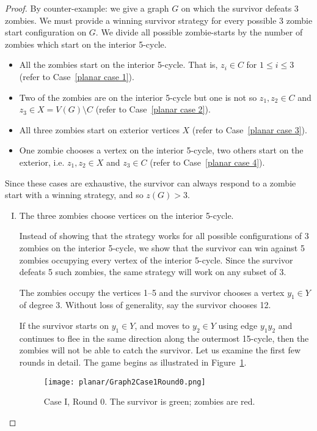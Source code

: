 \begin{proof}
  By counter-example: we give a graph $G$ on which the survivor defeats 3 zombies.
  We must provide a winning survivor strategy for every possible 3 zombie start configuration on $G$. We divide all possible zombie-starts by the number of zombies which start on the
  interior 5-cycle.

  \begin{itemize}
  \item All the zombies start on the interior 5-cycle. That is, $z_i \in C$ for $1 \leq i \leq 3$ (refer to Case~\ref{planar case 1}).
  \item Two of the zombies are on the interior 5-cycle but one is not so $z_1, z_2 \in C$ and $z_3 \in X = V(G) \setminus C$ (refer to Case~\ref{planar case 2}).
  \item All three zombies start on exterior vertices $X$ (refer to Case~\ref{planar case 3}).
  \item One zombie chooses a vertex on the interior 5-cycle, two others start on the exterior, i.e. $z_1, z_2 \in X$ and $z_3 \in C$ (refer to Case~\ref{planar case 4}).
  \end{itemize}

  Since these cases are exhaustive, the survivor can always respond to a zombie start with a winning
  strategy, and so $z(G) > 3$.

  \begin{enumerate}[I.]
\item The three zombies choose vertices on the interior 5-cycle. \label{planar case 1}

Instead of showing that the strategy works for all possible configurations of 3 zombies on the interior 5-cycle,
we show that the survivor can win against 5 zombies occupying every vertex of the interior 5-cycle.
Since the survivor defeats 5 such zombies, the same strategy will work on any subset of 3.

The zombies occupy the vertices 1--5 and the survivor chooses a vertex $y_1 \in Y$ of degree 3.
Without loss of generality, say the survivor chooses 12.

If the survivor starts on $y_1 \in Y$, and moves to $y_2\in Y$ using edge $y_1y_2$ and continues to flee in the same direction along the outermost 15-cycle, then the zombies will not be able to catch the survivor. Let us examine the first few rounds in detail. The game begins as illustrated in Figure~\ref{fig:planarG2C1R0}.

\begin{figure}
\centering
\texttt{[image: planar/Graph2Case1Round0.png]}
\caption{Case I, Round 0. The survivor is green; zombies are red.\label{fig:planarG2C1R0}}
\end{figure}


\end{enumerate}
\end{proof}
